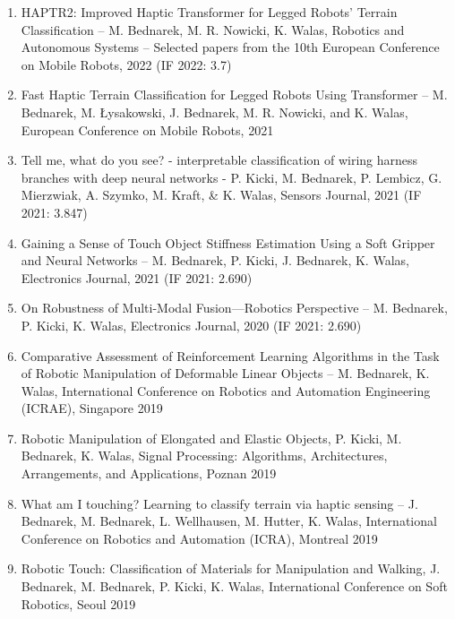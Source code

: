 \documentclass[a4paper, 10pt, twoside]{report}
\begin{document}
\begin{enumerate}
    \item HAPTR2: Improved Haptic Transformer for Legged Robots’ Terrain Classification – M. Bednarek, M. R. Nowicki, K. Walas, Robotics and Autonomous Systems – Selected papers from the 10th European Conference on Mobile Robots, 2022 (IF 2022: 3.7)

    \item Fast Haptic Terrain Classification for Legged Robots Using Transformer – M. Bednarek, M. Łysakowski, J. Bednarek, M. R. Nowicki, and K. Walas, European Conference on Mobile Robots, 2021

    \item Tell me, what do you see? - interpretable classification of wiring harness branches with deep neural networks - P. Kicki, M. Bednarek, P. Lembicz, G. Mierzwiak, A. Szymko, M. Kraft, \& K. Walas, Sensors Journal, 2021 (IF 2021: 3.847)

    \item Gaining a Sense of Touch Object Stiffness Estimation Using a Soft Gripper and Neural Networks – M. Bednarek, P. Kicki, J. Bednarek, K. Walas, Electronics Journal, 2021 (IF 2021: 2.690)

    \item On Robustness of Multi-Modal Fusion—Robotics Perspective – M. Bednarek, P. Kicki, K. Walas, Electronics Journal, 2020 (IF 2021: 2.690)

    \item Comparative Assessment of Reinforcement Learning Algorithms in the Task of Robotic Manipulation of Deformable Linear Objects – M. Bednarek, K. Walas, International Conference on Robotics and Automation Engineering (ICRAE), Singapore 2019

    \item Robotic Manipulation of Elongated and Elastic Objects, P. Kicki, M. Bednarek, K. Walas, Signal Processing: Algorithms, Architectures, Arrangements, and Applications, Poznan 2019

    \item What am I touching? Learning to classify terrain via haptic sensing – J. Bednarek, M. Bednarek, L. Wellhausen, M. Hutter, K. Walas, International Conference on Robotics and Automation (ICRA), Montreal 2019

    \item Robotic Touch: Classification of Materials for Manipulation and Walking, J. Bednarek, M. Bednarek, P. Kicki, K. Walas, International Conference on Soft Robotics, Seoul 2019


\end{enumerate}
\end{document}
